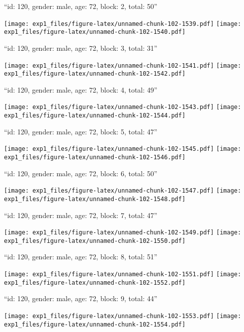 \documentclass[11pt,,]{article}
\begin{document}
\newpage
[1] 

``id: 120, gender: male, age: 72, block: 2, total: 50''

\texttt{[image: exp1\_files/figure-latex/unnamed-chunk-102-1539.pdf]}
\texttt{[image: exp1\_files/figure-latex/unnamed-chunk-102-1540.pdf]}

\newpage
[1] 

``id: 120, gender: male, age: 72, block: 3, total: 31''

\texttt{[image: exp1\_files/figure-latex/unnamed-chunk-102-1541.pdf]}
\texttt{[image: exp1\_files/figure-latex/unnamed-chunk-102-1542.pdf]}

\newpage
[1] 

``id: 120, gender: male, age: 72, block: 4, total: 49''

\texttt{[image: exp1\_files/figure-latex/unnamed-chunk-102-1543.pdf]}
\texttt{[image: exp1\_files/figure-latex/unnamed-chunk-102-1544.pdf]}

\newpage
[1] 

``id: 120, gender: male, age: 72, block: 5, total: 47''

\texttt{[image: exp1\_files/figure-latex/unnamed-chunk-102-1545.pdf]}
\texttt{[image: exp1\_files/figure-latex/unnamed-chunk-102-1546.pdf]}

\newpage
[1] 

``id: 120, gender: male, age: 72, block: 6, total: 50''

\texttt{[image: exp1\_files/figure-latex/unnamed-chunk-102-1547.pdf]}
\texttt{[image: exp1\_files/figure-latex/unnamed-chunk-102-1548.pdf]}

\newpage
[1] 

``id: 120, gender: male, age: 72, block: 7, total: 47''

\texttt{[image: exp1\_files/figure-latex/unnamed-chunk-102-1549.pdf]}
\texttt{[image: exp1\_files/figure-latex/unnamed-chunk-102-1550.pdf]}

\newpage
[1] 

``id: 120, gender: male, age: 72, block: 8, total: 51''

\texttt{[image: exp1\_files/figure-latex/unnamed-chunk-102-1551.pdf]}
\texttt{[image: exp1\_files/figure-latex/unnamed-chunk-102-1552.pdf]}

\newpage
[1] 

``id: 120, gender: male, age: 72, block: 9, total: 44''

\texttt{[image: exp1\_files/figure-latex/unnamed-chunk-102-1553.pdf]}
\texttt{[image: exp1\_files/figure-latex/unnamed-chunk-102-1554.pdf]}
\end{document}
